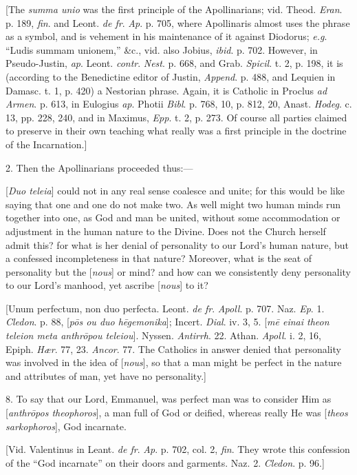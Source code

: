 [The \emph{summa unio} was the first principle of the Apollinarians;
vid. Theod. \emph{Eran}. p. 189, \emph{fin}. and Leont. \emph{de fr}. \emph{Ap}.
p. 705, where Apollinaris almost uses the phrase as a symbol, and is
vehement in his maintenance of it against Diodorus; \emph{e.g}. ``Ludis
summam unionem,'' \&c., vid. also Jobius, \emph{ibid}. p. 702.
However, in Pseudo-Justin, \emph{ap}. Leont. \emph{contr}. \emph{Nest}.
p. 668, and Grab. \emph{Spicil}. t. 2, p. 198, it is (according to the
Benedictine editor of Justin, \emph{Append}. p. 488, and Lequien in
Damasc. t. 1, p. 420) a Nestorian phrase. Again, it is Catholic in
Proclus \emph{ad Armen}. p. 613, in Eulogius \emph{ap}. Photii \emph{Bibl}.
p. 768, 10, p. 812, 20, Anast. \emph{Hodeg}. c. 13, pp. 228, 240, and
in Maximus, \emph{Epp}. t. 2, p. 273. Of course all parties claimed to
preserve in their own teaching what really was a first principle in
the doctrine of the Incarnation.]

2. Then the Apollinarians proceeded thus:—

[\emph{Duo teleia}] could not in any real sense coalesce and unite; for this would be like saying that one and one do not make two.
As well might two human minds run together into one, as God and man be
united, without some accommodation or adjustment in the human nature
to the Divine. Does not the Church herself admit this? for what is her
denial of personality to our Lord's human nature, but a confessed
incompleteness in that nature? Moreover, what is the seat of
personality but the [\emph{nous}] or mind? and how can we consistently
deny personality to our Lord's manhood, yet ascribe [\emph{nous}] to
it?

[Unum perfectum, non duo perfecta. Leont. \emph{de fr}. \emph{Apoll}.
p. 707. Naz. \emph{Ep}. 1. \emph{Cledon}. p. 88, [\emph{p\={o}s ou duo
h\={e}gemonika}]; Incert. \emph{Dial}. iv. 3, 5. [\emph{m\={e}
einai theon teleion meta anthr\={o}pou teleiou}]. Nyssen. \emph{Antirrh}.
22. Athan. \emph{Apoll}. i. 2, 16, Epiph. \emph{Hær}. 77, 23. \emph{Ancor}.
77. The Catholics in answer denied that personality was involved in
the idea of [\emph{nous}], so that a man might be perfect in the
nature and attributes of man, yet have no personality.]

8. To say that our Lord, Emmanuel, was perfect man was to consider
Him as [\emph{anthr\={o}pos theophoros}], a man full of God or
deified, whereas really He was [\emph{theos sarkophoros}], God
incarnate.

[Vid. Valentinus in Leant. \emph{de fr}. \emph{Ap}. p. 702, col. 2,
\emph{fin}. They wrote this confession of the ``God
incarnate'' on their doors and garments. Naz. 2. \emph{Cledon}. p.
96.]

